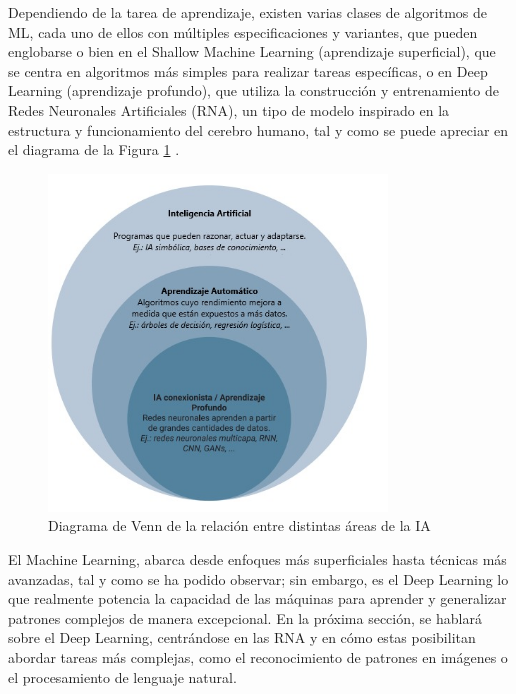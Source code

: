 
Dependiendo de la tarea de aprendizaje, existen varias clases de algoritmos de ML, cada uno de ellos con múltiples especificaciones y variantes, que pueden englobarse o bien en el Shallow Machine Learning (aprendizaje superficial), que se centra en algoritmos más simples para realizar tareas específicas, o en Deep Learning (aprendizaje profundo), que utiliza la construcción y entrenamiento de Redes Neuronales Artificiales (RNA), un tipo de modelo inspirado en la estructura y funcionamiento del cerebro humano, tal y como se puede apreciar en el diagrama de la Figura \ref{fig:AlgoritmosML} \cite{Janiesch21}. 

 \begin{figure} [H]
    \begin{center}
      \includegraphics[width=9cm]{figs/Algoritmos de ML.png}
    \end{center}
    \caption{Diagrama de Venn de la relación entre distintas áreas de la IA}
    \label{fig:AlgoritmosML}
\end{figure}

El Machine Learning, abarca desde enfoques más superficiales hasta técnicas más avanzadas, tal y como se ha podido observar; sin embargo, es el Deep Learning lo que realmente potencia la capacidad de las máquinas para aprender y generalizar patrones complejos de manera excepcional. En la próxima sección, se hablará sobre el Deep Learning, centrándose en las RNA y en cómo estas posibilitan abordar tareas más complejas, como el reconocimiento de patrones en imágenes o el procesamiento de lenguaje natural.


